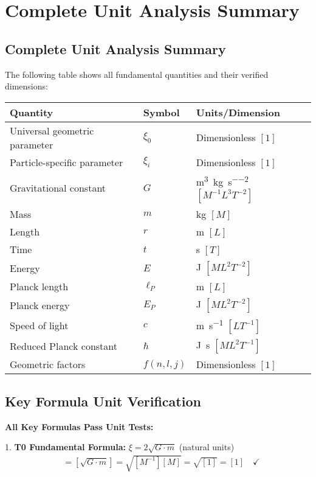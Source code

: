 \documentclass[12pt,a4paper]{article}
\newcommand{\xifunc}{f(n,l,j)}
\theoremstyle{definition}
\begin{document}
	\section{Complete Unit Analysis Summary}
	
	\subsection{Complete Unit Analysis Summary}
	
	The following table shows all fundamental quantities and their verified dimensions:
	
	\begin{center}
		\begin{tabular}{lll}
			\toprule
			\textbf{Quantity} & \textbf{Symbol} & \textbf{Units/Dimension} \\
			\midrule
			Universal geometric parameter & $\xi_0$ & Dimensionless $[1]$ \\
			Particle-specific parameter & $\xi_i$ & Dimensionless $[1]$ \\
			Gravitational constant & $G$ & \si{\metre\cubed\per\kilogram\per\second\squared} $[M^{-1}L^3T^{-2}]$ \\
			Mass & $m$ & \si{\kilogram} $[M]$ \\
			Length & $r$ & \si{\metre} $[L]$ \\
			Time & $t$ & \si{\second} $[T]$ \\
			Energy & $E$ & \si{\joule} $[ML^2T^{-2}]$ \\
			Planck length & $\ell_P$ & \si{\metre} $[L]$ \\
			Planck energy & $E_P$ & \si{\joule} $[ML^2T^{-2}]$ \\
			Speed of light & $c$ & \si{\metre\per\second} $[LT^{-1}]$ \\
			Reduced Planck constant & $\hbar$ & \si{\joule\second} $[ML^2T^{-1}]$ \\
			Geometric factors & $\xifunc$ & Dimensionless $[1]$ \\
			\bottomrule
		\end{tabular}
	\end{center}
	
	\subsection{Key Formula Unit Verification}
	
	 
		\textbf{All Key Formulas Pass Unit Tests:}
		
		1. \textbf{T0 Fundamental Formula:} $\xi = 2\sqrt{G \cdot m}$ (natural units)
		\begin{align}
			[\xi] &= [\sqrt{G \cdot m}] = \sqrt{[M^{-1}][M]} = \sqrt{[1]} = [1] \quad \checkmark
		\end{align}
		
\end{document}
